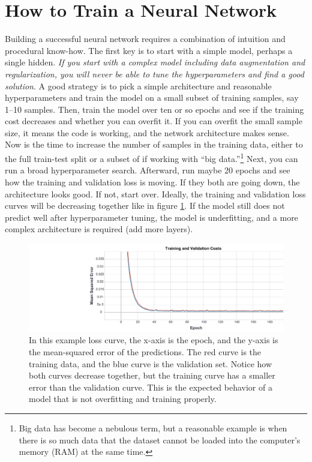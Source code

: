 \section{How to Train a Neural Network}
Building a successful neural network requires a combination of intuition and procedural know-how. The first key is to start with a simple model, perhaps a single hidden. \textit{If you start with a complex model including data augmentation and regularization, you will never be able to tune the hyperparameters and find a good solution}. A good strategy is to pick a simple architecture and reasonable hyperparameters and train the model on a small subset of training samples, say 1--10 samples. Then, train the model over ten or so epochs and see if the training cost decreases and whether you can overfit it. If you can overfit the small sample size, it means the code is working, and the network architecture makes sense. Now is the time to increase the number of samples in the training data, either to the full train-test split or a subset of if working with ``big data.''\footnote{Big data has become a nebulous term, but a reasonable example is when there is so much data that the dataset cannot be loaded into the computer's memory (RAM) at the same time.} Next, you can run a broad hyperparameter search. Afterward, run maybe 20 epochs and see how the training and validation loss is moving. If they both are going down, the architecture looks good. If not, start over. Ideally, the training and validation loss curves will be decreasing together like in figure \ref{fig:Example-Training-Loss-Curve}. If the model still does not predict well after hyperparameter tuning, the model is underfitting, and a more complex architecture is required (add more layers).

\begin{figure}
    \includegraphics[width=\linewidth]{Chapters/Figures/epoch_loss1.pdf}
    \caption[Example ANN Training Curve]{In this example loss curve, the x-axis is the epoch, and the y-axis is the mean-squared error of the predictions. The red curve is the training data, and the blue curve is the validation set. Notice how both curves decrease together, but the training curve has a smaller error than the validation curve. This is the expected behavior of a model that is not overfitting and training properly.}
    \label{fig:Example-Training-Loss-Curve}
\end{figure}

